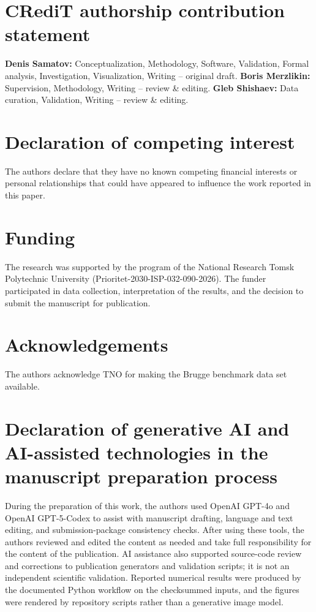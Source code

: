 \section*{CRediT authorship contribution statement}
\textbf{Denis Samatov:} Conceptualization, Methodology, Software, Validation, Formal analysis, Investigation, Visualization, Writing -- original draft. \textbf{Boris Merzlikin:} Supervision, Methodology, Writing -- review \& editing. \textbf{Gleb Shishaev:} Data curation, Validation, Writing -- review \& editing.

\section*{Declaration of competing interest}
The authors declare that they have no known competing financial interests or personal relationships that could have appeared to influence the work reported in this paper.

\section*{Funding}
The research was supported by the program of the National Research Tomsk Polytechnic University (Prioritet-2030-ISP-032-090-2026). The funder participated in data collection, interpretation of the results, and the decision to submit the manuscript for publication.

\section*{Acknowledgements}
The authors acknowledge TNO for making the Brugge benchmark data set available.

\section*{Declaration of generative AI and AI-assisted technologies in the manuscript preparation process}
During the preparation of this work, the authors used OpenAI GPT-4o and OpenAI GPT-5-Codex to assist with manuscript drafting, language and text editing, and submission-package consistency checks. After using these tools, the authors reviewed and edited the content as needed and take full responsibility for the content of the publication. AI assistance also supported source-code review and corrections to publication generators and validation scripts; it is not an independent scientific validation. Reported numerical results were produced by the documented Python workflow on the checksummed inputs, and the figures were rendered by repository scripts rather than a generative image model.
